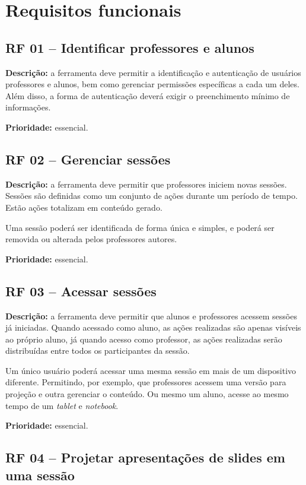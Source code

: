 \section{Requisitos funcionais}

\subsection{RF 01 – Identificar professores e alunos}

\textbf{Descrição:} a ferramenta deve permitir a identificação e autenticação de usuários professores e alunos, bem como gerenciar permissões específicas a cada um deles. Além disso, a forma de autenticação deverá exigir o preenchimento mínimo de informações.

\textbf{Prioridade:} essencial.

\subsection{RF 02 – Gerenciar sessões}

\textbf{Descrição:} a ferramenta deve permitir que professores iniciem novas sessões. Sessões são definidas como um conjunto de ações durante um período de tempo. Estão ações totalizam em conteúdo gerado.

Uma sessão poderá ser identificada de forma única e simples, e poderá ser removida ou alterada pelos professores autores.

\textbf{Prioridade:} essencial.

\subsection{RF 03 – Acessar sessões}

\textbf{Descrição:} a ferramenta deve permitir que alunos e professores acessem sessões já iniciadas. Quando acessado como aluno, as ações realizadas são apenas visíveis ao próprio aluno, já quando acesso como professor, as ações realizadas serão distribuídas entre todos os participantes da sessão.

Um único usuário poderá acessar uma mesma sessão em mais de um dispositivo diferente. Permitindo, por exemplo, que professores acessem uma versão para projeção e outra gerenciar o conteúdo. Ou mesmo um aluno, acesse ao mesmo tempo de um \emph{tablet} e \emph{notebook}.

\textbf{Prioridade:} essencial.

\subsection{RF 04 – Projetar apresentações de slides em uma sessão}

